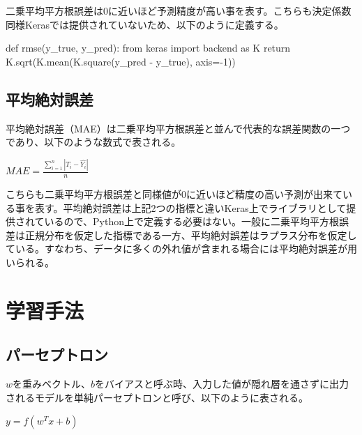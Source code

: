 \documentclass{report}
\begin{document}
二乗平均平方根誤差は0に近いほど予測精度が高い事を表す。こちらも決定係数同様Kerasでは提供されていないため、以下のように定義する。
\\


\begin{python}[caption=二乗平均平方根誤差]
def rmse(y_true, y_pred):
    from keras import backend as K
    return K.sqrt(K.mean(K.square(y_pred - y_true),
    axis=-1)) 
\end{python}






\subsection{平均絶対誤差}

平均絶対誤差（MAE）は二乗平均平方根誤差と並んで代表的な誤差関数の一つであり、以下のような数式で表される。

\begin{center}
\begin{math}
MAE = \frac{\sum_{i=1}^{n}|T_i-\hat{Y_i}|}{n} 
\end{math}
\end{center}


こちらも二乗平均平方根誤差と同様値が0に近いほど精度の高い予測が出来ている事を表す。平均絶対誤差は上記2つの指標と違いKeras上でライブラリとして提供されているので、Python上で定義する必要はない。一般に二乗平均平方根誤差は正規分布を仮定した指標である一方、平均絶対誤差はラプラス分布を仮定している。すなわち、データに多くの外れ値が含まれる場合には平均絶対誤差が用いられる。

\newpage
\section{学習手法}
\subsection{パーセプトロン}

\begin{math}w\end{math}を重みベクトル、\begin{math}b\end{math}をバイアスと呼ぶ時、入力した値が隠れ層を通さずに出力されるモデルを単純パーセプトロンと呼び、以下のように表される。

\begin{center}
\begin{math}
y = f(w^{T}x+b)
\end{math}
\end{center}
\end{document}
